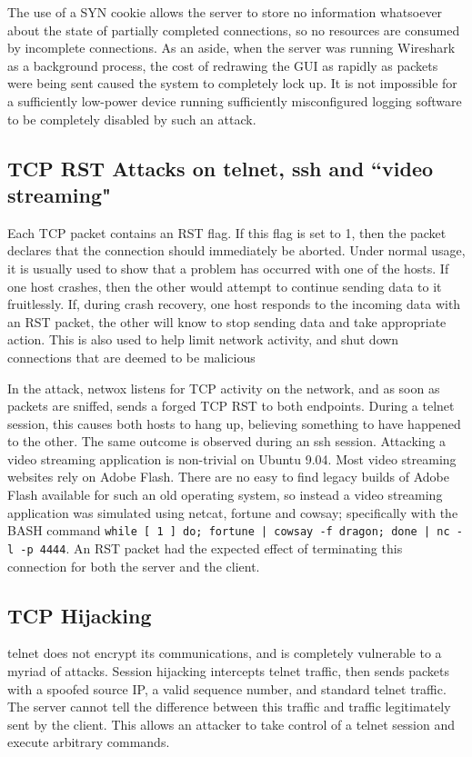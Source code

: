 The use of a SYN cookie allows the server to store no information whatsoever about the state of partially completed
connections, so no resources are consumed by incomplete connections. As an aside, when the server was running Wireshark
as a background process, the cost of redrawing the GUI as rapidly as packets were being sent caused the system to
completely lock up. It is not impossible for a sufficiently low-power device running sufficiently misconfigured logging
software to be completely disabled by such an attack.

\subsection{TCP RST Attacks on telnet, ssh and ``video streaming"}

Each TCP packet contains an RST flag. If this flag is set to 1, then the packet declares that the connection should
immediately be aborted. Under normal usage, it is usually used to show that a problem has occurred with one of the
hosts. If one host crashes, then the other would attempt to continue sending data to it fruitlessly. If, during crash
recovery, one host responds to the incoming data with an RST packet, the other will know to stop sending data and take
appropriate action. This is also used to help limit network activity, and shut down connections that are deemed to be
malicious

In the attack, netwox %
listens for TCP activity on the network, and as soon as packets are sniffed, sends a forged TCP RST to both endpoints.
During a telnet session, this causes both hosts to hang up, believing something to have happened to the other. The same
outcome is observed during an ssh session. Attacking a video streaming application is non-trivial on Ubuntu 9.04. Most
video streaming websites rely on Adobe Flash. There are no easy to find legacy builds of Adobe Flash available for such
an old operating system, so instead a video streaming application was simulated using netcat, fortune and cowsay;
specifically with the BASH command {\tt while [ 1 ] do; fortune | cowsay -f dragon; done | nc -l -p 4444}. An RST packet
had the expected effect of terminating this connection for both the server and the client.

\subsection{TCP Hijacking}

telnet does not encrypt its communications, and is completely vulnerable to a myriad of attacks. Session hijacking
intercepts telnet traffic, then sends packets with a spoofed source IP, a valid sequence number, and standard telnet
traffic. The server cannot tell the difference between this traffic and traffic legitimately sent by the client. This
allows an attacker to take control of a telnet session and execute arbitrary commands.

